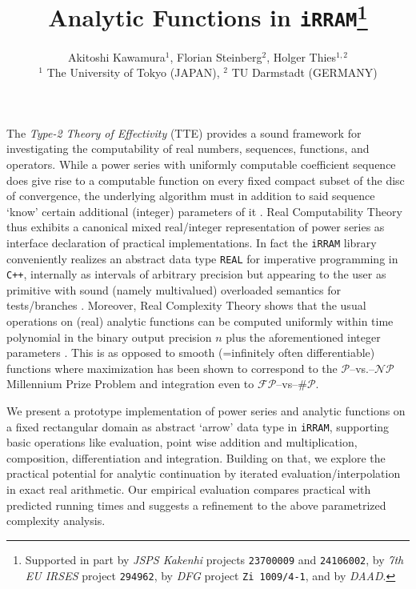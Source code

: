\documentclass{article}
\newcommand{\p}{\ensuremath{\mathcal P}\xspace}
\newcommand{\np}{\ensuremath{\mathcal{NP}}\xspace}
\newcommand{\fp}{\ensuremath{\mathcal{FP}}\xspace}
\newcommand{\sharpp}{\ensuremath{\# \mathcal{P}}\xspace}
\newcommand{\cc}{\texttt{C++}\xspace}
\newcommand{\irram}{\texttt{iRRAM}\xspace}
\newcommand{\REAL}{\texttt{REAL}\xspace}
\begin{document}
\title{Analytic Functions in \irram\thanks{%
Supported in part by \emph{JSPS Kakenhi} projects
\texttt{23700009} and \texttt{24106002},
by \emph{7th EU IRSES} project \texttt{294962},
by \emph{DFG} project \texttt{Zi\,1009/4-1},
and by \emph{DAAD}.}}
\author{Akitoshi Kawamura$^1$, \quad Florian Steinberg$^2$, \quad Holger Thies$^{1,2}$ 
\\
$^1$ The University of Tokyo (JAPAN), \quad $^2$ TU Darmstadt (GERMANY)}
\date{}
\maketitle
\noindent
The \emph{Type-2 Theory of Effectivity} (TTE) provides a sound framework for
investigating the computability of real numbers, sequences,
functions, and operators. 
While a power series with uniformly computable coefficient sequence 
does give rise to a computable function on every fixed compact
subset of the disc of convergence, the underlying algorithm must
in addition to said sequence `know' certain additional 
(integer) parameters of it \cite{Mueller95}.
Real Computability Theory thus exhibits a canonical mixed real/integer 
representation of power series as interface declaration of practical 
implementations. In fact the \irram library conveniently realizes an
abstract data type \REAL for imperative programming in \cc,
internally as intervals of arbitrary precision
but appearing to the user as primitive with sound
(namely multivalued) overloaded semantics for tests/branches \cite{Mueller00}.
Moreover, Real Complexity Theory shows
that the usual operations on (real) analytic functions can
be computed uniformly within time polynomial in the binary
output precision $n$ plus the aforementioned integer parameters \cite{Kawamura2012}.
This is as opposed to smooth (=infinitely often differentiable)
functions where maximization has been shown to correspond to
the \p--vs.--\np  Millennium Prize Problem 
and integration even to \fp--vs--\sharpp \cite{MR666209,MR748898,MR1137517}.

We present a prototype implementation of power series 
and analytic functions on a fixed rectangular domain 
as abstract `arrow' data type in \irram,
supporting basic operations like evaluation,
point wise addition and multiplication, composition,
differentiation and integration. Building on that,
we explore the practical potential for analytic 
continuation by iterated evaluation/interpolation
in exact real arithmetic. Our empirical evaluation
compares practical with predicted running times and suggests
a refinement to the above parametrized complexity analysis.

\small

{}
\end{document}
